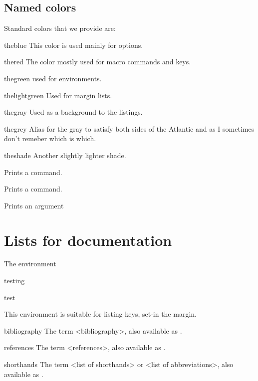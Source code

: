 \subsection{Named colors}
Standard colors that we provide are:
\begin{marglist}
\item [\textcolor{theblue}{theblue}] This color is used mainly for options.
\item [\textcolor{thered}{thered}] The color mostly used for macro commands and keys.
\item [\textcolor{thegreen}{thegreen}] used for environments.
\item [\textcolor{thelightgreen}{thelightgreen}] Used for margin lists.
\item [\textcolor{thegray}{thegray}] Used as a background to the listings.
\item [\colorbox{thegrey}{\color{white}thegrey}] Alias for the gray to satisfy both sides of the Atlantic and as I sometimes don't remeber which is which.
\item [\colorbox{theshade}{theshade}] Another slightly lighter shade.
\end{marglist}



\begin{marglist}
\item [\cs{cs}]  Prints a command.
\item [\cs{cmd}] Prints a command.
\item[\cs{meta}]  Prints an argument
\end{marglist}




\section{Lists for documentation}



The environment 
\begin{marglist}
\item[testing]\lorem
\item [test]\lorem
\end{marglist}

This environment is suitable for listing keys, set-in the margin.

\begin{keymarglist}
\item[bibliography] The term <bibliography>, also available as .
\item[references] The term <references>, also available as .
\item[shorthands] The term <list of shorthands> or <list of abbreviations>, also available as .
\end{keymarglist}


